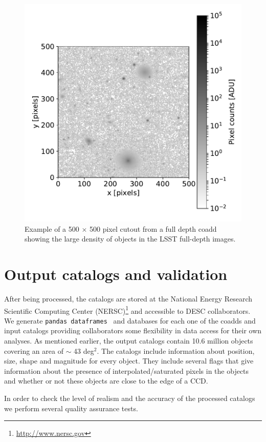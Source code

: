 \documentclass[twocolumn]{aastex62}
\begin{document}
\begin{figure}
\centering
\includegraphics[width=0.9\columnwidth]{sample_coadd_DC1.pdf}
\caption{Example of a 500 $\times$ 500 pixel cutout from a full depth coadd showing the large density of objects in the LSST full-depth images.}
\label{fig:coadd_example}
\end{figure}

\section{Output catalogs and validation}
\label{sec:catalogs}

After being processed, the catalogs are stored at the National Energy Research Scientific Computing Center (NERSC)\footnote{\url{http://www.nersc.gov}} and accessible to DESC collaborators. We generate \texttt{pandas
dataframes}~\citep{mckinneypandas} and databases for each one of the coadds and input catalogs providing collaborators some flexibility in data access for their own analyses. As mentioned earlier, the output catalogs contain 10.6 million objects covering an area
of $\sim$ 43 deg$^{2}$. The catalogs include information about position, size, shape and magnitude for every object. They include several flags that give information about the presence of interpolated/saturated pixels in the objects and whether or not these objects are close to the edge of a CCD.

In order to check the level of realism and the accuracy of the processed catalogs we perform several quality assurance tests.
\end{document}
